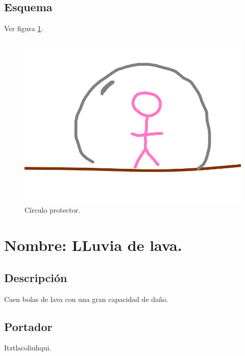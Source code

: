 \subsection{Esquema}
			Ver figura \ref{fig:circuloP}.
			\begin{figure}
				\centering
				\includegraphics[height=0.2 \textheight]{Imagenes/circuloP}
				\caption{Círculo protector.}
				\label{fig:circuloP}
			\end{figure}

\section{Nombre: LLuvia de lava.} \label{hab.LLuviaLava}
\subsection{Descripción}
Caen bolas de lava con una gran capacidad de daño.
\subsection{Portador}
Itztlacoliuhqui.	
